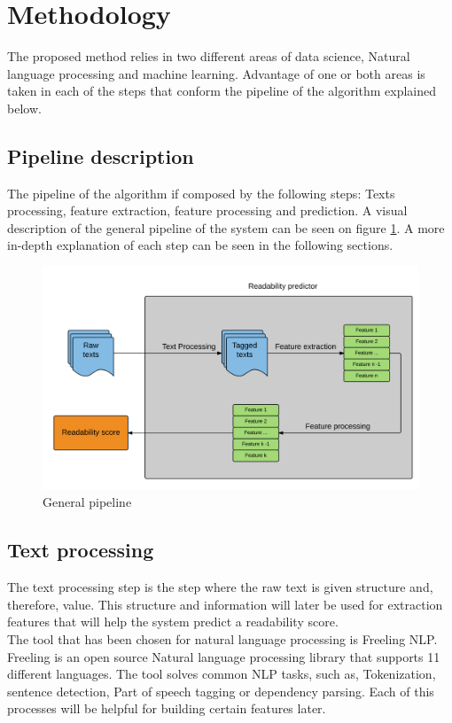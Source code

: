 \documentclass[12pt]{article}
\begin{document}
\section{Methodology}
The proposed method relies in two different areas of data science, Natural language processing and machine learning. Advantage of one or both areas is taken in each of the steps that conform the pipeline of the algorithm explained below.
\subsection{Pipeline description}
The pipeline of the algorithm if composed by the following steps: Texts processing, feature extraction, feature processing and prediction. A visual description of the general pipeline of the system can be seen on figure \ref{fig:pipeline}.  A more in-depth explanation of each step can be seen in the following sections.

\begin{figure}[h]
\includegraphics[width=\textwidth]{pipeline}
\caption{General pipeline}
\label{fig:pipeline}
\end{figure}

\subsection{Text processing}

The text processing step is the step where the raw text is given structure and, therefore, value. This structure and information will later be used for extraction features that will help the system predict a readability score.\\

The tool that has been chosen for natural language processing is Freeling NLP\cite{freelingNLP}. Freeling is an open source Natural language processing library that supports 11 different languages. The tool solves common NLP tasks, such as, Tokenization, sentence detection, Part of speech tagging or dependency parsing. Each of this processes will be helpful for building certain features later.\\
\end{document}
